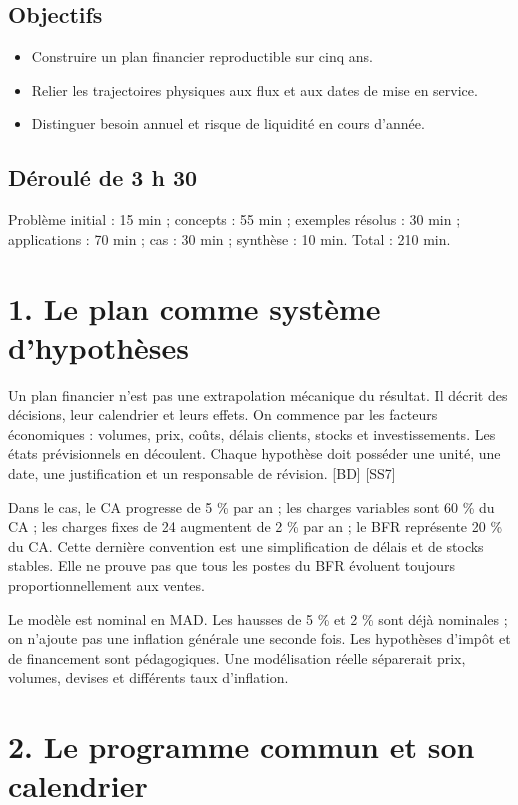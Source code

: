 \documentclass[12pt,a4paper]{article}
\begin{document}
\subsection*{Objectifs}
\begin{itemize}\item Construire un plan financier reproductible sur cinq ans.\item Relier les trajectoires physiques aux flux et aux dates de mise en service.\item Distinguer besoin annuel et risque de liquidité en cours d’année.\end{itemize}
\subsection*{Déroulé de 3 h 30}
Problème initial : 15 min ; concepts : 55 min ; exemples résolus : 30 min ; applications : 70 min ; cas : 30 min ; synthèse : 10 min. Total : 210 min.

\section*{1. Le plan comme système d’hypothèses}
Un plan financier n’est pas une extrapolation mécanique du résultat. Il décrit des décisions, leur calendrier et leurs effets. On commence par les facteurs économiques : volumes, prix, coûts, délais clients, stocks et investissements. Les états prévisionnels en découlent. Chaque hypothèse doit posséder une unité, une date, une justification et un responsable de révision. [BD] [SS7]


Dans le cas, le CA progresse de 5 \% par an ; les charges variables sont 60 \% du CA ; les charges fixes de 24 augmentent de 2 \% par an ; le BFR représente 20 \% du CA. Cette dernière convention est une simplification de délais et de stocks stables. Elle ne prouve pas que tous les postes du BFR évoluent toujours proportionnellement aux ventes.


Le modèle est nominal en MAD. Les hausses de 5 \% et 2 \% sont déjà nominales ; on n’ajoute pas une inflation générale une seconde fois. Les hypothèses d’impôt et de financement sont pédagogiques. Une modélisation réelle séparerait prix, volumes, devises et différents taux d’inflation.

\section*{2. Le programme commun et son calendrier}
\end{document}
